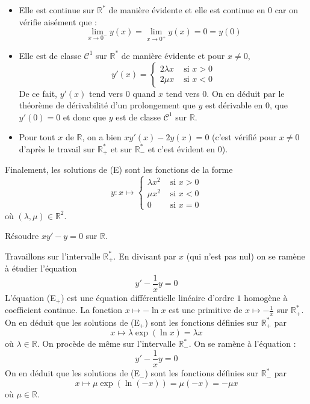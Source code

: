 \documentclass[a4paper,10pt]{report}
\begin{document}
\begin{itemize}
\item Elle est continue sur $\mathbb R^*$ de manière évidente et elle est continue en $0$ car on vérifie aisément que :
 $$\lim\limits_{x \to 0^-} y(x) = \lim\limits_{x \to 0^+} y(x) = 0 = y(0)$$
\item Elle est de classe $\mathcal C^1$ sur $\mathbb R^*$ de manière évidente et pour $x \neq 0$, 
$$y'(x) =  \left\{\begin{array}{ll} 2\lambda x & \text{ si } x > 0 \\ 2\mu x & \text{ si } x < 0 \end{array}\right.$$
De ce fait, $y'(x)$ tend vers $0$ quand $x$ tend vers $0$. On en déduit par le théorème de dérivabilité d'un prolongement que $y$ est dérivable en $0$, que $y'(0)=0$ et donc que $y$ est de classe $\mathcal C^1$ sur $\mathbb R$.
\item Pour tout $x$ de $\mathbb R$, on a bien $xy'(x) -2y(x) = 0$ (c'est vérifié pour $x \neq 0$ d'après le travail sur $\mathbb{R}_+^*$ et sur $\mathbb{R}_{-}^*$ et c'est évident en $0$).
\end{itemize}
Finalement, les solutions de (E) sont les fonctions de la forme
$$y  : x \mapsto \left\{\begin{array}{ll} \lambda x^2 & \text{ si } x > 0 \\ \mu x^2 & \text{ si } x < 0 \\   0 & \text{ si } x = 0\end{array}\right.$$
où $(\lambda,\mu) \in \mathbb R^2$.

\begin{Exa} Résoudre $xy' -y = 0$ sur $\mathbb{R}$.
\end{Exa}

\corr Travaillons sur l'intervalle $\mathbb R_+^*$. En divisant par $x$ (qui n'est pas nul) on se ramène à étudier l'équation
\begin{equation}
\tag{E$_+$}
y'  -\dfrac{1}{x}y = 0
\end{equation}
L'équation (E$_+$) est une équation différentielle  linéaire d'ordre $1$ homogène à coefficient continue. La fonction $x \mapsto -\ln x$ est une primitive de $x \mapsto - \frac{1}{x}$ sur $\mathbb R_+^*$. On en déduit que les solutions de (E$_+$) sont les fonctions définies sur $\mathbb R_+^*$ par 
$$x \mapsto \lambda \exp(\ln x) = \lambda x$$
où $\lambda  \in \mathbb R$. On procède de même sur l'intervalle $\mathbb R_-^*$. On se ramène à l'équation :
\begin{equation}
\tag{E$_-$}
y' -\dfrac{1}{x}y = 0
\end{equation}
On en déduit que les solutions de (E$_-$) sont les fonctions définies sur $\mathbb R_-^*$ par 
$$x \mapsto \mu\exp(\ln (-x)) = \mu(-x) = -\mu x$$
où $\mu \in \mathbb R$.
\end{document}
